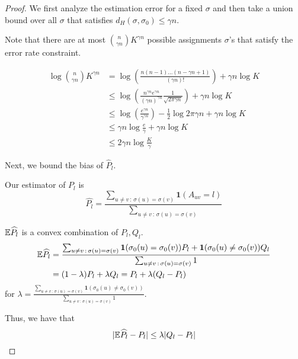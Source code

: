 \begin{proof}

We first analyze the estimation error for a fixed $\sigma$ and then take a union bound over all $\sigma$ that satisfies $d_H(\sigma, \sigma_0) \leq \gamma n$. 

Note that there are at most $\binom{n}{\gamma n} K^{\gamma n}$ possible assignments $\sigma$'s that satisfy the error rate constraint. 

\begin{align*}
\log \binom{n}{\gamma n} K^{\gamma n} & =
  \log \left( \frac{ n(n-1) ...(n-\gamma n+1) }{(\gamma n)!} \right) + \gamma n \log K \\
 & \leq \log \left( \frac{ n^{\gamma n} e^{\gamma n} }
     { (\gamma n)^{\gamma n} } \frac{1}{\sqrt{2\pi \gamma n}} \right) + \gamma n \log K \\
 & \leq \log \left( \frac{ e^{\gamma n} }{\gamma^{\gamma n}} \right) - \frac{1}{2} \log 2 \pi \gamma n + \gamma n \log K \\
 & \leq \gamma n \log \frac{e}{\gamma}  + \gamma n \log K \\
 & \leq 2 \gamma n \log \frac{K}{\gamma}
\end{align*}


Next, we bound the bias of $\hat{P}_l$.

Our estimator of $P_l$ is 
\[
\hat{P_l} = \frac{ \sum_{u \neq v \,:\, \sigma(u) = \sigma(v)} \mathbf{1}(A_{uv} = l) }{
                   \sum_{u \neq v \,:\, \sigma(u) = \sigma(v)} }
\]

${\mathbb E} \widehat{P}_l$ is a convex combination of $P_l, Q_l$. 
\begin{align}
{\mathbb E} \widehat{P_l} &= 
   \frac{ \sum_{u \neq v \,:\, \sigma(u) = \sigma(v)} 
             \mbox{\boldmath $1$}(\sigma_0(u) = \sigma_0(v) ) P_l + 
               \mbox{\boldmath $1$}(\sigma_0(u) \neq \sigma_0(v)) Q_l }{
                   \sum_{u \neq v \,:\, \sigma(u) = \sigma(v)} 1 } \nonumber \\
  &= (1 - \lambda) P_l + \lambda Q_l  = P_l + \lambda (Q_l - P_l) \label{eqn:bias_simple_bound}
\end{align}
for $\lambda = \frac{\sum_{u \neq v \,:\, \sigma(u) = \sigma(v)} 
     \mathbf{1}(\sigma_0(u) \neq \sigma_0(v)) }{\sum_{u \neq v \,:\, \sigma(u) = \sigma(v)} 1}$.

Thus, we have that 
\[
|{\mathbb E} \widehat{P}_l - P_l | \leq \lambda |Q_l - P_l|
\]


\end{proof}
